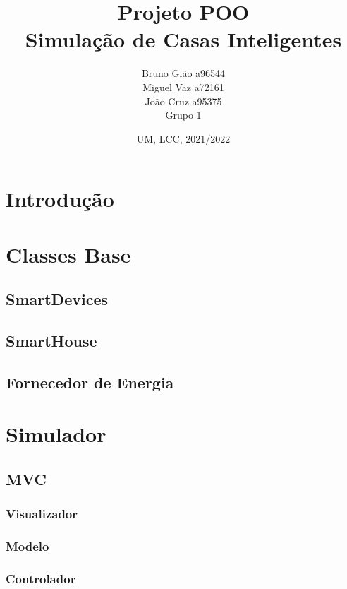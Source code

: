 \documentclass[10pt, a4paper]{article}
\title{Projeto POO\\
        Simulação de Casas Inteligentes}
\author{Bruno Gião a96544 \\ Miguel Vaz a72161 \\ João Cruz a95375 \\ Grupo 1}
\date{UM, LCC, 2021/2022}
\begin{document}
\maketitle

\newpage
\tableofcontents
\newpage

\section{Introdução}
\lipsum[1]
\section{Classes Base}
\lipsum[1]
\subsection{SmartDevices}
\lipsum[1]
\subsection{SmartHouse}
\lipsum[1]
\subsection{Fornecedor de Energia}
\lipsum[1]
\section{Simulador}
\lipsum[1]
\subsection{MVC}
\lipsum[1]
\subsubsection{Visualizador}
\lipsum[1]
\subsubsection{Modelo}
\lipsum[2]
\subsubsection{Controlador}
\lipsum[2]
\end{document}
